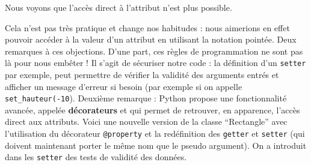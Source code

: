 \documentclass[
  a4paper,
  DIV=11,
  numbers=noendperiod]{scrartcl}
\begin{document}
Nous voyons que l'accès direct à l'attribut n'est plus possible.

Cela n'est pas très pratique et change nos habitudes : nous aimerions en
effet pouvoir accéder à la valeur d'un attribut en utilisant la notation
pointée. Deux remarques à ces objections. D'une part, ces règles de
programmation ne sont pas là pour nous embêter ! Il s'agit de sécuriser
notre code : la définition d'un \texttt{setter} par exemple, peut
permettre de vérifier la validité des arguments entrés et afficher un
message d'erreur si besoin (par exemple si on appelle
\texttt{set\_hauteur(-10}). Deuxième remarque : Python propose une
fonctionnalité avancée, appelée \textbf{décorateurs} et qui permet de
retrouver, en apparence, l'accès direct aux attributs. Voici une
nouvelle version de la classe ``Rectangle'' avec l'utilisation du
décorateur \texttt{@property} et la redéfinition des \texttt{getter} et
\texttt{setter} (qui doivent maintenant porter le même nom que le pseudo
argument). On a introduit dans les \texttt{setter} des tests de validité
des données.
\end{document}
